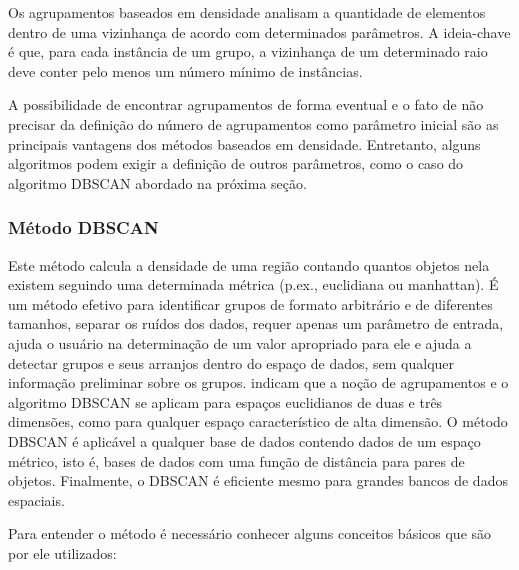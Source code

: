 Os agrupamentos baseados em densidade analisam a quantidade de elementos dentro de uma vizinhança de acordo com determinados parâmetros. A ideia-chave é que, para cada instância de um grupo, a vizinhança de um determinado raio deve conter pelo menos um número mínimo de instâncias.

A possibilidade de encontrar agrupamentos de forma eventual e o fato de não precisar da definição do número de agrupamentos \cite{yip2005} como parâmetro inicial são as principais vantagens dos métodos baseados em densidade. Entretanto, alguns algoritmos podem exigir a definição de outros parâmetros, como o caso do algoritmo DBSCAN \cite{ESTER1996} abordado na próxima seção.

\subsubsection{Método DBSCAN}
\label{dbscan}

Este método calcula a densidade de uma região contando quantos objetos nela existem seguindo uma determinada métrica (p.ex., euclidiana ou manhattan). É um método efetivo para identificar grupos de formato arbitrário e de diferentes tamanhos, separar os ruídos dos dados, requer apenas um parâmetro de entrada, ajuda o usuário na determinação de um valor apropriado para ele e ajuda a detectar grupos e seus arranjos dentro do espaço de dados, sem qualquer informação preliminar sobre os grupos.
\cite{ESTER1996}  indicam que a noção de agrupamentos e o algoritmo DBSCAN se aplicam para espaços euclidianos de duas e três dimensões, como para qualquer espaço característico de alta dimensão. O método DBSCAN é aplicável a qualquer base de dados contendo dados de um espaço métrico, isto é, bases de dados com uma função de distância para pares de objetos. Finalmente, o DBSCAN é eficiente mesmo para grandes bancos de dados espaciais.

Para entender o método é necessário conhecer alguns conceitos básicos que são por ele utilizados: 

